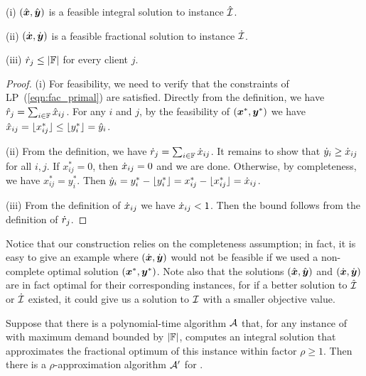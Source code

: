 \documentclass{llncs}
\begin{document}

\begin{lemma}\label{lem: polynomial demands partition}
{\rm (i)}
  $(\hat{\boldsymbol{x}}, \hat{\boldsymbol{y}})$ is a feasible integral solution to
  instance ${\hat{\cal I}}$.

\noindent
{\rm (ii)}
  $(\dot{\boldsymbol{x}}, \dot{\boldsymbol{y}})$ is a feasible fractional
  solution to instance ${\dot{\cal I}}$.

\noindent
{\rm (iii)}
${\dot r}_j\leq |\mathbb{F}|$ for every client $j$.

\end{lemma}

\begin{proof}
(i) For feasibility, we need to verify that the constraints of LP~(\ref{eqn:fac_primal})
are satisfied. Directly from the definition, we have ${\hat r}_j = \sum_{i\in\mathbb{F}} {\hat x}_{ij}$.
For any $i$ and $j$, by the feasibility of $(\boldsymbol{x}^\ast,\boldsymbol{y}^\ast)$ we have
${\hat x}_{ij} = { \lfloor x_{ij}^\ast \rfloor } \le { \lfloor y^\ast_i \rfloor } = {\hat y}_i$.

(ii) From the definition, we have  ${\dot r}_j = \sum_{i\in\mathbb{F}} {\dot x}_{ij}$.
It remains to show that ${\dot y}_i \geq {\dot x}_{ij}$ for all $i,j$. 
If $x_{ij}^\ast=0$, then ${\dot x}_{ij}=0$ and we are done. 
Otherwise, by completeness, we have $x_{ij}^\ast=y_i^\ast$. 
Then  ${\dot y}_i = y_i^\ast - { \lfloor y_i^\ast \rfloor } = x_{ij}^\ast - { \lfloor x_{ij}^\ast \rfloor } ={\dot x}_{ij}$. 

(iii) From the definition of ${\dot x}_{ij}$ we have
  ${\dot x}_{ij} < 1$.  Then the bound follows from the definition of ${\dot r}_j$.
\end{proof}

Notice that our construction relies on the completeness assumption; in
fact, it is easy to give an example where $(\dot{\boldsymbol{x}}, \dot{\boldsymbol{y}})$ would
not be feasible if we used a non-complete optimal solution
$(\boldsymbol{x}^\ast,\boldsymbol{y}^\ast)$.  Note also that the solutions
$(\hat{\boldsymbol{x}},\hat{\boldsymbol{y}})$ and $(\dot{\boldsymbol{x}}, \dot{\boldsymbol{y}})$ are in fact optimal for
their corresponding instances, for if a better solution to ${\hat{\cal I}}$
or ${\dot{\cal I}}$ existed, it could give us a solution to $\mathcal{I}$ with a
smaller objective value.


\begin{theorem}\label{thm: reduction to polynomial}
  Suppose that there is a polynomial-time algorithm ${\cal A}$
  that, for any instance of {\FTFP} with maximum demand
  bounded by $|\mathbb{F}|$, computes an integral solution
  that approximates the fractional optimum of this instance
  within factor $\rho\geq 1$.  Then there is a
  $\rho$-approximation algorithm ${\cal A}'$ for {\FTFP}.
\end{theorem}
\end{document}

